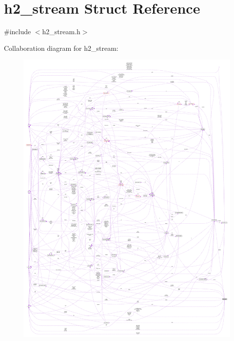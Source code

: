 \hypertarget{structh2__stream}{}\section{h2\+\_\+stream Struct Reference}
\label{structh2__stream}


{\ttfamily \#include $<$h2\+\_\+stream.\+h$>$}



Collaboration diagram for h2\+\_\+stream\+:
\nopagebreak
\begin{figure}[H]
\begin{center}
\leavevmode
\includegraphics[width=350pt]{structh2__stream__coll__graph}
\end{center}
\end{figure}
